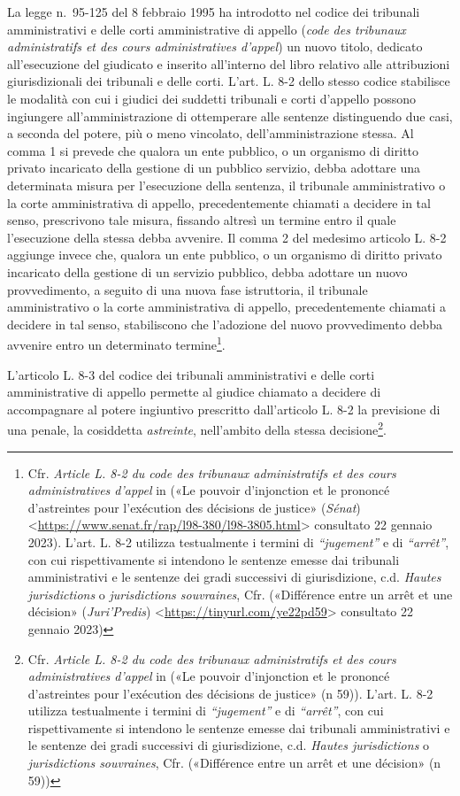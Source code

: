\documentclass[12pt,it,a4paper,]{report}
\begin{document}
La legge n.~95-125 del 8 febbraio 1995 ha introdotto nel codice dei
tribunali amministrativi e delle corti amministrative di appello
(\emph{code des tribunaux administratifs et des cours administratives
d'appel}) un nuovo titolo, dedicato all'esecuzione del giudicato e
inserito all'interno del libro relativo alle attribuzioni
giurisdizionali dei tribunali e delle corti. L'art. L. 8-2 dello stesso
codice stabilisce le modalità con cui i giudici dei suddetti tribunali e
corti d'appello possono ingiungere all'amministrazione di ottemperare
alle sentenze distinguendo due casi, a seconda del potere, più o meno
vincolato, dell'amministrazione stessa. Al comma 1 si prevede che
qualora un ente pubblico, o un organismo di diritto privato incaricato
della gestione di un pubblico servizio, debba adottare una determinata
misura per l'esecuzione della sentenza, il tribunale amministrativo o la
corte amministrativa di appello, precedentemente chiamati a decidere in
tal senso, prescrivono tale misura, fissando altresì un termine entro il
quale l'esecuzione della stessa debba avvenire. Il comma 2 del medesimo
articolo L. 8-2 aggiunge invece che, qualora un ente pubblico, o un
organismo di diritto privato incaricato della gestione di un servizio
pubblico, debba adottare un nuovo provvedimento, a seguito di una nuova
fase istruttoria, il tribunale amministrativo o la corte amministrativa
di appello, precedentemente chiamati a decidere in tal senso,
stabiliscono che l'adozione del nuovo provvedimento debba avvenire entro
un determinato termine\footnote{Cfr. \emph{Article L. 8-2 du code des
  tribunaux administratifs et des cours administratives d'appel} in
  ({«Le pouvoir d'injonction et le prononcé d'astreintes pour
  l'exécution des décisions de justice»} (\emph{Sénat})
  \textless{}\url{https://www.senat.fr/rap/l98-380/l98-3805.html}\textgreater{}
  consultato 22 gennaio 2023). L'art. L. 8-2 utilizza testualmente i
  termini di \emph{``jugement''} e di \emph{``arrêt''}, con cui
  rispettivamente si intendono le sentenze emesse dai tribunali
  amministrativi e le sentenze dei gradi successivi di giurisdizione,
  c.d. \emph{Hautes jurisdictions} o \emph{jurisdictions souvraines},
  Cfr. ({«Différence entre un arrêt et une décision»}
  (\emph{Juri'Predis})
  \textless{}\url{https://tinyurl.com/ye22pd59}\textgreater{} consultato
  22 gennaio 2023)}.

L'articolo L. 8-3 del codice dei tribunali amministrativi e delle corti
amministrative di appello permette al giudice chiamato a decidere di
accompagnare al potere ingiuntivo prescritto dall'articolo L. 8-2 la
previsione di una penale, la cosiddetta \emph{astreinte}, nell'ambito
della stessa decisione\footnote{Cfr. \emph{Article L. 8-2 du code des
  tribunaux administratifs et des cours administratives d'appel} in
  ({«Le pouvoir d'injonction et le prononcé d'astreintes pour
  l'exécution des décisions de justice»} (n 59)). L'art. L. 8-2 utilizza
  testualmente i termini di \emph{``jugement''} e di \emph{``arrêt''},
  con cui rispettivamente si intendono le sentenze emesse dai tribunali
  amministrativi e le sentenze dei gradi successivi di giurisdizione,
  c.d. \emph{Hautes jurisdictions} o \emph{jurisdictions souvraines},
  Cfr. ({«Différence entre un arrêt et une décision»} (n 59))}.
\end{document}
